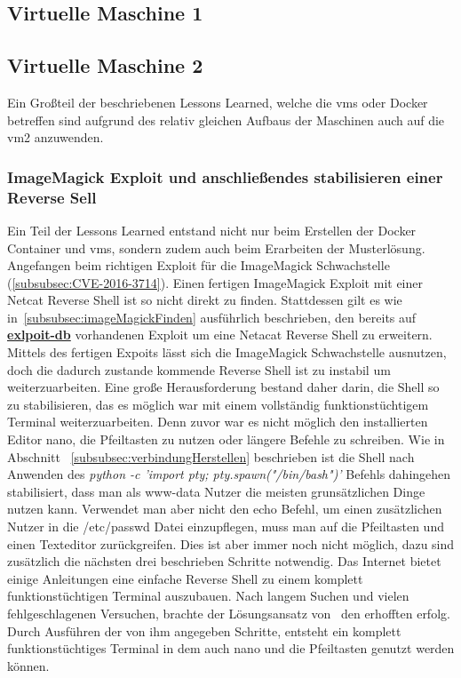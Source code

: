 \documentclass[10pt, a4paper,onecolumn ,titlepage]{article}
\begin{document}
    \subsection{Virtuelle Maschine 1} %
    \label{subsec:vm1lessonslearned}

    \subsection{Virtuelle Maschine 2}
    \label{subsec:vm2LessonsLearned}
    Ein Großteil der beschriebenen Lessons Learned, welche die \ac{vm}s oder Docker betreffen sind aufgrund des relativ gleichen Aufbaus der Maschinen auch auf die \ac{vm}2 anzuwenden.

    \subsubsection{ImageMagick Exploit und anschließendes stabilisieren einer Reverse Sell}
    \label{subsubsec:lessonslearnedShell}
    Ein Teil der Lessons Learned entstand nicht nur beim Erstellen der Docker Container und \ac{vm}s, sondern zudem auch beim Erarbeiten der Musterlösung.
    Angefangen beim richtigen Exploit für die ImageMagick Schwachstelle (\ref{subsubsec:CVE-2016-3714}).
    Einen fertigen ImageMagick Exploit mit einer Netcat Reverse Shell ist so nicht direkt zu finden.
    Stattdessen gilt es wie in~\ref{subsubsec:imageMagickFinden} ausführlich beschrieben, den bereits auf \href{https://www.exploit-db.com/exploits/39767}{\textbf{exlpoit-db}} vorhandenen Exploit um eine Netacat Reverse Shell zu erweitern.
    Mittels des fertigen Expoits lässt sich die ImageMagick Schwachstelle ausnutzen, doch die dadurch zustande kommende Reverse Shell ist zu instabil um weiterzuarbeiten.
    Eine große Herausforderung bestand daher darin, die Shell so zu stabilisieren, das es möglich war mit einem vollständig funktionstüchtigem Terminal weiterzuarbeiten.
    Denn zuvor war es nicht möglich den installierten Editor nano, die Pfeiltasten zu nutzen oder längere Befehle zu schreiben.
    Wie in Abschnitt ~\ref{subsubsec:verbindungHerstellen} beschrieben ist die Shell nach Anwenden des \textit{python -c 'import pty; pty.spawn("/bin/bash")'} Befehls dahingehen stabilisiert, dass man als www-data Nutzer die meisten grunsätzlichen Dinge nutzen kann.
    Verwendet man aber nicht den echo Befehl, um einen zusätzlichen Nutzer in die /etc/passwd Datei einzupflegen, muss man auf die Pfeiltasten und einen Texteditor zurückgreifen.
    Dies ist aber immer noch nicht möglich, dazu sind zusätzlich die nächsten drei beschrieben Schritte notwendig.
    Das Internet bietet einige Anleitungen eine einfache Reverse Shell zu einem komplett funktionstüchtigen Terminal auszubauen.
    Nach langem Suchen und vielen fehlgeschlagenen Versuchen, brachte der Lösungsansatz von~\textcite{shellStabilisieren} den erhofften erfolg.
    Durch Ausführen der von ihm angegeben Schritte, entsteht ein komplett funktionstüchtiges Terminal in dem auch nano und die Pfeiltasten genutzt werden können.
\end{document}
